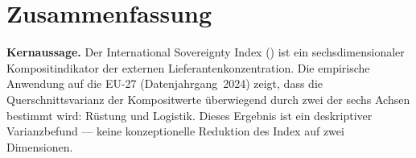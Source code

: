 
\section{Zusammenfassung}
\label{sec:summary}

\begin{sloppypar}
\textbf{Kernaussage.}
Der International Sovereignty Index (\ISI) ist ein
sechs\-dimensionaler Kompositindikator der externen
Lieferanten\-konzentration.  Die empirische Anwendung auf die EU-27
(Datenjahrgang~2024) zeigt, dass die Querschnitts\-varianz der
Kompositwerte \"uberwiegend durch zwei der sechs Achsen bestimmt
wird: R\"ustung und Logistik.  Dieses Ergebnis ist ein deskriptiver
Varianzbefund --- keine konzeptionelle Reduktion des Index auf
zwei Dimensionen.
\end{sloppypar}

